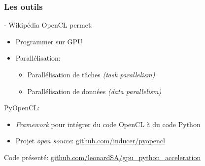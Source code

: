 \begin{frame}
    \frametitle{Les outils}
    \newline
    \-- Wikipédia\pause{}
    \vspace{20pt}
    \newline
    OpenCL permet:\pause{}
    \begin{itemize}
        \item Programmer sur GPU\pause{}
        \item Parallélisation:
            \begin{itemize}
                \item Parallélisation de tâches \textit{(task parallelism)}
                \item Parallélisation de données \textit{(data parallelism)}
            \end{itemize}
    \end{itemize}\pause{}
    \vspace{20pt}
    PyOpenCL:\pause{}
    \begin{itemize}
        \item \textit{Framework} pour intégrer du code OpenCL à du code Python\pause{}
        \item Projet \textit{open source}: \url{github.com/inducer/pyopencl}
    \end{itemize}\pause{}
    \vspace{20pt}
    Code présenté: \url{github.com/leonardSA/gpu_python_acceleration}
\end{frame}


